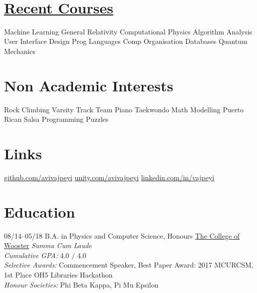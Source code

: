 \documentclass[]{friggeri-cv}
\def\faLinkedIn{\FA\symbol{"F08C}} %
\begin{document}
\begin{aside}
    ~
    ~
    \section{\href{https://github.com/avivajpeyi/Work-Files/blob/master/Avi_UnofficialTranscript_120916.pdf}{Recent Courses}}
    Machine Learning
    General Relativity 
    Computational Physics
    Algorithm Analysis
    User Interface Design
    Prog Languages
    Comp Organisation
    Databases
    Quantum Mechanics
~
    ~
  \section{Non Academic Interests}
    Rock Climbing
    Varsity Track Team
    Piano
    Taekwondo
    Math Modelling 
    Puerto Rican Salsa
    Programming Puzzles
    ~
    ~
     ~
     ~
     ~
  \section{Links}
    \href{https://github.com/avivajpeyi}{github.com/avivajpeyi}
    \href{https://connect.unity.com/u/5839ddf732b306002a9e7422}{unity.com/avivajpeyi}
    \href{https://www.linkedin.com/in/vajpeyi}{ linkedin.com/in/vajpeyi} 
\end{aside}

\section{Education}
\begin{entrylist}
  \entry
    {08/14–05/18}
    {B.A. in Physics and Computer Science, Honours}
    {\href{https://www.wooster.edu/}{The College of Wooster}}
    {\emph{Summa Cum Laude}\\
    \emph{Cumulative GPA:} 4.0 $/$ 4.0\\ 
    \emph{Selective Awards:} Commencement Speaker, Best Paper Award: 2017 MCURCSM, 1st Place OH5 Libraries Hackathon\\
    \emph{Honour Societies:} Phi Beta Kappa, Pi Mu Epsilon}
\end{entrylist}
%
\end{document}

